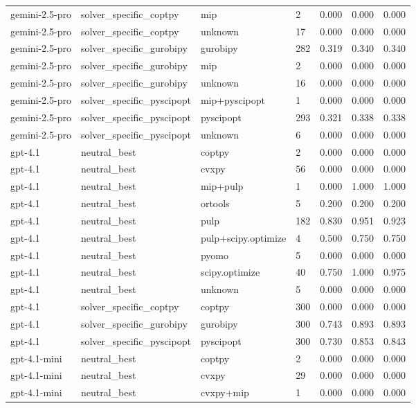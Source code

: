 \begin{table}[t]
\begin{tabular}{lllllll}
gemini-2.5-pro & solver\_specific\_coptpy & mip & 2 & 0.000 & 0.000 & 0.000 \\
gemini-2.5-pro & solver\_specific\_coptpy & unknown & 17 & 0.000 & 0.000 & 0.000 \\
gemini-2.5-pro & solver\_specific\_gurobipy & gurobipy & 282 & 0.319 & 0.340 & 0.340 \\
gemini-2.5-pro & solver\_specific\_gurobipy & mip & 2 & 0.000 & 0.000 & 0.000 \\
gemini-2.5-pro & solver\_specific\_gurobipy & unknown & 16 & 0.000 & 0.000 & 0.000 \\
gemini-2.5-pro & solver\_specific\_pyscipopt & mip+pyscipopt & 1 & 0.000 & 0.000 & 0.000 \\
gemini-2.5-pro & solver\_specific\_pyscipopt & pyscipopt & 293 & 0.321 & 0.338 & 0.338 \\
gemini-2.5-pro & solver\_specific\_pyscipopt & unknown & 6 & 0.000 & 0.000 & 0.000 \\
gpt-4.1 & neutral\_best & coptpy & 2 & 0.000 & 0.000 & 0.000 \\
gpt-4.1 & neutral\_best & cvxpy & 56 & 0.000 & 0.000 & 0.000 \\
gpt-4.1 & neutral\_best & mip+pulp & 1 & 0.000 & 1.000 & 1.000 \\
gpt-4.1 & neutral\_best & ortools & 5 & 0.200 & 0.200 & 0.200 \\
gpt-4.1 & neutral\_best & pulp & 182 & 0.830 & 0.951 & 0.923 \\
gpt-4.1 & neutral\_best & pulp+scipy.optimize & 4 & 0.500 & 0.750 & 0.750 \\
gpt-4.1 & neutral\_best & pyomo & 5 & 0.000 & 0.000 & 0.000 \\
gpt-4.1 & neutral\_best & scipy.optimize & 40 & 0.750 & 1.000 & 0.975 \\
gpt-4.1 & neutral\_best & unknown & 5 & 0.000 & 0.000 & 0.000 \\
gpt-4.1 & solver\_specific\_coptpy & coptpy & 300 & 0.000 & 0.000 & 0.000 \\
gpt-4.1 & solver\_specific\_gurobipy & gurobipy & 300 & 0.743 & 0.893 & 0.893 \\
gpt-4.1 & solver\_specific\_pyscipopt & pyscipopt & 300 & 0.730 & 0.853 & 0.843 \\
gpt-4.1-mini & neutral\_best & coptpy & 2 & 0.000 & 0.000 & 0.000 \\
gpt-4.1-mini & neutral\_best & cvxpy & 29 & 0.000 & 0.000 & 0.000 \\
gpt-4.1-mini & neutral\_best & cvxpy+mip & 1 & 0.000 & 0.000 & 0.000 \\

\end{tabular}
\end{table}
